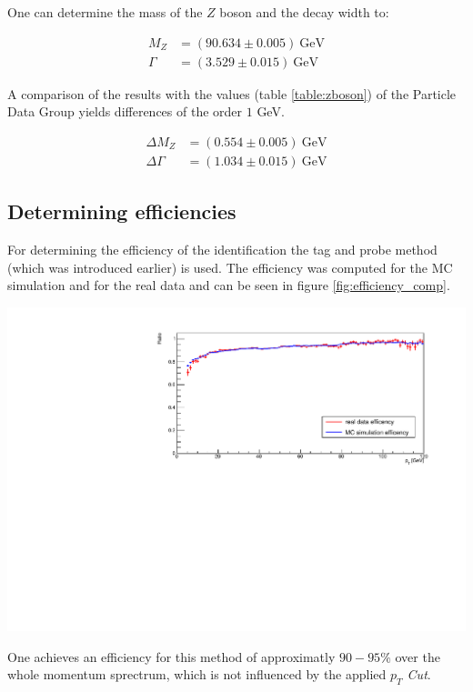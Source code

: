 \documentclass[12pt, a4paper, bibliography=totoc]{scrartcl}
\begin{document}
\begin{multicols}{2}
One can determine the mass of the $Z$ boson and the decay width to: 

\begin{align}
M_Z &= (90.634 \pm 0.005) \ \text{GeV}\\
\Gamma &= (3.529 \pm 0.015) \ \text{GeV}
\end{align}

A comparison of the results with the values (table \ref{table:zboson}) of the Particle Data Group yields differences of the order $1$ GeV.
 
\begin{align}
\Delta M_Z &= (0.554 \pm 0.005) \ \text{GeV}\\
\Delta \Gamma &= (1.034 \pm 0.015) \ \text{GeV}
\end{align}
 
\subsection{Determining efficiencies}
For determining the efficiency of the identification the tag and probe method (which was introduced earlier) is used.
The efficiency was computed for the MC simulation and for the real data and can be seen in figure \ref{fig:efficiency_comp}.

\begin{center}
    \includegraphics[width=\linewidth]{fig/efficency_comparison.pdf}
    \label{fig:efficiency_comp}
\end{center}

One achieves an efficiency for this method of approximatly $90-95\%$ over the whole momentum sprectrum, which is not influenced by the applied \textit{$p_T$ Cut}.


\end{multicols}
\end{document}
